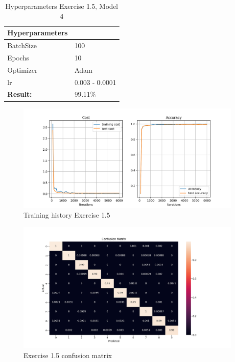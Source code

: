 \documentclass[a4paper,10pt]{article}
\begin{document}
\begin{table}[ht!]
\centering
\begin{tabular}{ll}\hline 
 \textbf{Hyperparameters}&    \\ \hline
 BatchSize&  100  \\
 Epochs&  10 \\ 
 Optimizer& Adam  \\
 lr& 0.003 - 0.0001 \\ \hline
\textbf{Result: }&   99.11\% \\ \hline
\end{tabular}
\caption{Hyperparameters Exercise 1.5, Model 4}
\label{tab:tab7}
\end{table}

\begin{figure}[ht!]
\centering
\includegraphics[width=120mm]{figures/assignment_3/improved_torch4.png}
\caption{Training history Exercise 1.5}
\label{fig:historyimproved}
\end{figure}

\newpage

\begin{figure}[ht!]
\centering
\includegraphics[width=120mm]{figures/assignment_3/improved_torch4_CM.png}
\caption{Exercise 1.5 confusion matrix}
\label{fig:CM}
\end{figure}
\end{document}
